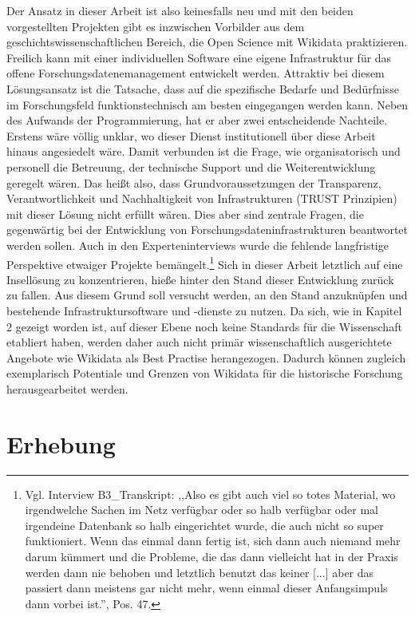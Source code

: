 Der Ansatz in dieser Arbeit ist also keinesfalls neu und mit den beiden vorgestellten Projekten gibt es inzwischen Vorbilder aus dem geschichtswissenschaftlichen Bereich, die Open Science mit Wikidata praktizieren. Freilich kann mit einer individuellen Software eine eigene Infrastruktur für das offene Forschungsdatenemanagement entwickelt werden. Attraktiv bei diesem Lösungsansatz ist die Tatsache, dass auf die spezifische Bedarfe und Bedürfnisse im Forschungsfeld funktionstechnisch am besten eingegangen werden kann. Neben des Aufwands der Programmierung, hat er aber zwei entscheidende Nachteile. Erstens wäre völlig unklar, wo dieser Dienst institutionell über diese Arbeit hinaus angesiedelt wäre. Damit verbunden ist die Frage, wie organisatorisch und personell die Betreuung, der technische Support und die Weiterentwicklung geregelt wären. Das heißt also, dass Grundvoraussetzungen der Transparenz, Verantwortlichkeit und Nachhaltigkeit von Infrastrukturen (TRUST Prinzipien) mit dieser Lösung nicht erfüllt wären. Dies aber sind zentrale Fragen, die gegenwärtig bei der Entwicklung von Forschungsdateninfrastrukturen beantwortet werden sollen. Auch in den Experteninterviews wurde die fehlende langfristige Perspektive etwaiger Projekte bemängelt.\footnote{Vgl. Interview B3\_Transkript: ,,Also es gibt auch viel so totes Material, wo irgendwelche Sachen im Netz verfügbar oder so halb verfügbar oder mal irgendeine Datenbank so halb eingerichtet wurde, die auch nicht so super funktioniert. Wenn das einmal dann fertig ist, sich dann auch niemand mehr darum kümmert und die Probleme, die das dann vielleicht hat in der Praxis werden dann nie behoben und letztlich benutzt das keiner [...] aber das passiert dann meistens gar nicht mehr, wenn einmal dieser Anfangsimpuls dann vorbei ist.'', Pos. 47.} Sich in dieser Arbeit letztlich auf eine Insellösung zu konzentrieren, hieße hinter den Stand dieser Entwicklung zurück zu fallen. Aus diesem Grund soll versucht werden, an den Stand anzuknüpfen und bestehende Infrastruktursoftware und -dienste zu nutzen. Da sich, wie in Kapitel 2 gezeigt worden ist, auf dieser Ebene noch keine Standards für die Wissenschaft etabliert haben, werden daher auch nicht primär wissenschaftlich ausgerichtete Angebote wie Wikidata als Best Practise herangezogen. Dadurch können zugleich exemplarisch Potentiale und Grenzen von Wikidata für die historische Forschung herausgearbeitet werden.

\section{Erhebung}

